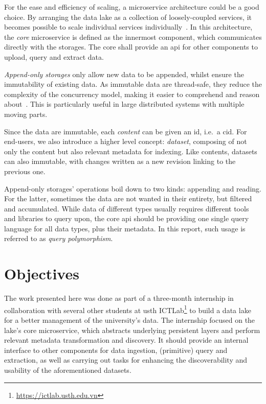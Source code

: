 \documentclass[a4paper,12pt]{book}
\begin{document}
For the ease and efficiency of scaling, a microservice architecture
could be a good choice.  By arranging the data lake as a collection
of loosely-coupled services, it becomes possible to scale individual services
individually~\cite{micro}.  In this architecture, the \emph{core} microservice
is defined as the innermost component, which communicates directly
with the storages.  The core shall provide an \gls{api} for other components
to upload, query and extract data.

\emph{Append-only storages} only allow new data to be appended, whilst ensure
the immutability of existing data.  As immutable data are thread-safe,
they reduce the complexity of the concurrency model, making it easier
to comprehend and reason about~\cite{pure}.  This is particularly useful
in large distributed systems with multiple moving parts.

Since the data are immutable, each \emph{\gls{content}} can be given
an \gls{id}, i.e.~a \gls{cid}.  For end-users, we also introduce
a higher level concept: \emph{dataset}, composing of not only the content
but also relevant metadata for indexing.  Like contents, datasets can also
immutable, with changes written as a new revision linking to the previous one.

Append-only storages' operations boil down to two kinds: appending and reading.
For the latter, sometimes the data are not wanted in their entirety,
but filtered and accumulated.  While data of different types usually requires
different tools and libraries to query upon, the core \gls{api} should be
providing one single query language for all data types, plus their metadata.
In this report, such usage is referred to as \emph{query polymorphism}.

\section{Objectives}
The work presented here was done as part of a three-month internship
in collaboration with several other students
at \gls{usth} ICTLab\footnote{\url{https://ictlab.usth.edu.vn}} to build
a data lake for a better management of the university's data.  The internship
focused on the lake's core microservice, which abstracts underlying
persistent layers and perform relevant metadata transformation and discovery.
It should provide an internal interface to other components for data ingestion,
(primitive) query and extraction, as well as carrying out tasks for enhancing
the discoverability and usability of the aforementioned datasets.
\end{document}
